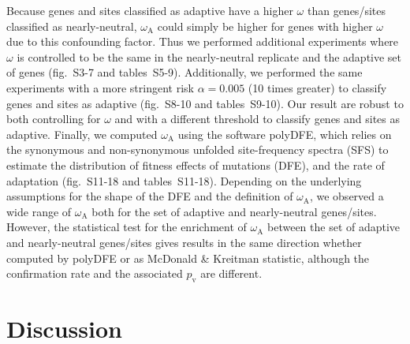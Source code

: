 \documentclass[9pt,twocolumn,twoside,lineno]{pnas-new}
\newcommand{\rateApop}{\omega_{\mathrm{A}}}
\begin{document}
Because genes and sites classified as adaptive have a higher $\omega$ than genes/sites classified as nearly-neutral, $\rateApop$ could simply be higher for genes with higher $\omega$ due to this confounding factor.
Thus we performed additional experiments where $\omega$ is controlled to be the same in the nearly-neutral replicate and the adaptive set of genes (fig.~S3-7 and tables~S5-9).
Additionally, we performed the same experiments with a more stringent risk $\alpha=0.005$ (10 times greater) to classify genes and sites as adaptive (fig.~S8-10 and tables~S9-10).
Our result are robust to both controlling for $\omega$ and with a different threshold to classify genes and sites as adaptive.
Finally, we computed $\rateApop$ using the software polyDFE\cite{tataru_polydfe_2020}, which relies on the synonymous and non-synonymous unfolded site-frequency spectra (SFS) to estimate the distribution of fitness effects of mutations (DFE), and the rate of adaptation (fig.~S11-18 and tables~S11-18).
Depending on the underlying assumptions for the shape of the DFE and the definition of $\rateApop$, we observed a wide range of $\rateApop$ both for the set of adaptive and nearly-neutral genes/sites.
However, the statistical test for the enrichment of $\rateApop$ between the set of adaptive and nearly-neutral genes/sites gives results in the same direction whether computed by polyDFE or as McDonald \& Kreitman statistic\cite{mcdonald_adaptative_1991}, although the confirmation rate and the associated $p_{\mathrm{v}}$ are different.

\section*{Discussion}\label{sec:discussion}
\end{document}
